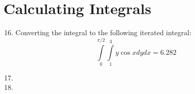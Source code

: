 \documentclass{article}
\begin{document}
\section{Calculating Integrals}

\begin{enumerate}[1.]
  \setcounter{enumi}{15}
  \item Converting the integral to the following iterated integral:
    $$ \int\limits_{0}^{\pi/2}\int\limits_{1}^{3} y \cos x dy dx = 6.282 $$
  \item
  \item
\end{enumerate}
\end{document}

